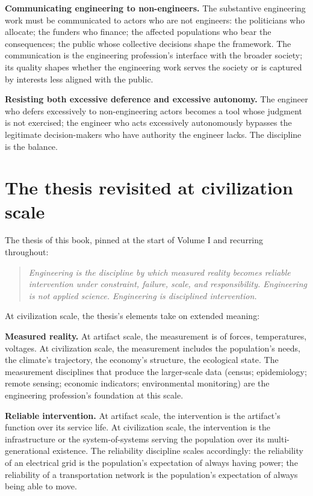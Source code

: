 \textbf{Communicating engineering to non-engineers.} The substantive engineering work must be communicated to actors who are not engineers: the politicians who allocate; the funders who finance; the affected populations who bear the consequences; the public whose collective decisions shape the framework. The communication is the engineering profession's interface with the broader society; its quality shapes whether the engineering work serves the society or is captured by interests less aligned with the public.

\textbf{Resisting both excessive deference and excessive autonomy.} The engineer who defers excessively to non-engineering actors becomes a tool whose judgment is not exercised; the engineer who acts excessively autonomously bypasses the legitimate decision-makers who have authority the engineer lacks. The discipline is the balance.

\section{The thesis revisited at civilization scale}

The thesis of this book, pinned at the start of Volume I and recurring throughout:

\begin{quote}
\emph{Engineering is the discipline by which measured reality becomes reliable intervention under constraint, failure, scale, and responsibility. Engineering is not applied science. Engineering is disciplined intervention.}
\end{quote}

At civilization scale, the thesis's elements take on extended meaning:

\textbf{Measured reality.} At artifact scale, the measurement is of forces, temperatures, voltages. At civilization scale, the measurement includes the population's needs, the climate's trajectory, the economy's structure, the ecological state. The measurement disciplines that produce the larger-scale data (census; epidemiology; remote sensing; economic indicators; environmental monitoring) are the engineering profession's foundation at this scale.

\textbf{Reliable intervention.} At artifact scale, the intervention is the artifact's function over its service life. At civilization scale, the intervention is the infrastructure or the system-of-systems serving the population over its multi-generational existence. The reliability discipline scales accordingly: the reliability of an electrical grid is the population's expectation of always having power; the reliability of a transportation network is the population's expectation of always being able to move.

